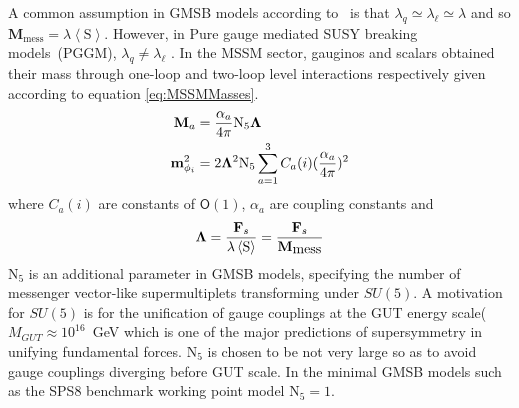 {A common assumption in GMSB models according to~\cite{GMSB, SUSYBOOK} is that $\lambda_{q} \simeq \lambda_{\ell} \simeq \lambda $ and so $\mathbf{M}_{\mbox{mess}} = \lambda \left\langle \mathrm{S} \right\rangle$. However, in  Pure gauge mediated SUSY breaking models~(PGGM), $\lambda_{q} \neq \lambda_{\ell}$ \cite{PGGM}.
In the MSSM sector, gauginos and scalars obtained their mass through one-loop and two-loop level interactions respectively given according to equation \ref{eq:MSSMMasses}.
\begin{align}{\label{eq:MSSMMasses}}
\mathbf{M}_{a} &= \frac{\alpha_{a}}{4\pi}\mathrm{N_{5}}\mathbf{\Lambda} \\ 
\mathbf{m}^{2}_{\phi_{i}} &= 2\mathbf{\Lambda}^{2}\mathrm{N_{5}}\sum_{a=1}^{3}C_{a}(i) ( \frac{\alpha_{a}}{4\pi})^{2}
\end{align}
where $C_{a}(i)$ are constants of $\mathsf{O}(1)$, $\alpha_{a}$ are coupling constants and 
\begin{equation}{\label{eq:Lambda}}
\mathbf{\Lambda} = \frac{\mathbf{F}_{s}}{\lambda \left\langle \mathrm{S} \right\rangle } = \frac{\mathbf{F}_{s}}{\mathbf{M}_{\mbox{mess}}}
\end{equation} 
$\mathrm{N_{5}}$ is an additional parameter in GMSB models, specifying the number of messenger vector-like supermultiplets transforming under $SU(5)$. A motivation for $SU(5)$ is for the unification of gauge couplings at the GUT energy scale($M_{GUT} \approx 10^{16}$~GeV which is one of the major predictions of supersymmetry in unifying fundamental forces.
$\mathrm{N_{5}}$ is chosen to be not very large so as to avoid gauge couplings diverging before GUT scale. In the minimal GMSB models such as the SPS8 benchmark working point model $\mathrm{N_{5}} = 1$.



}
